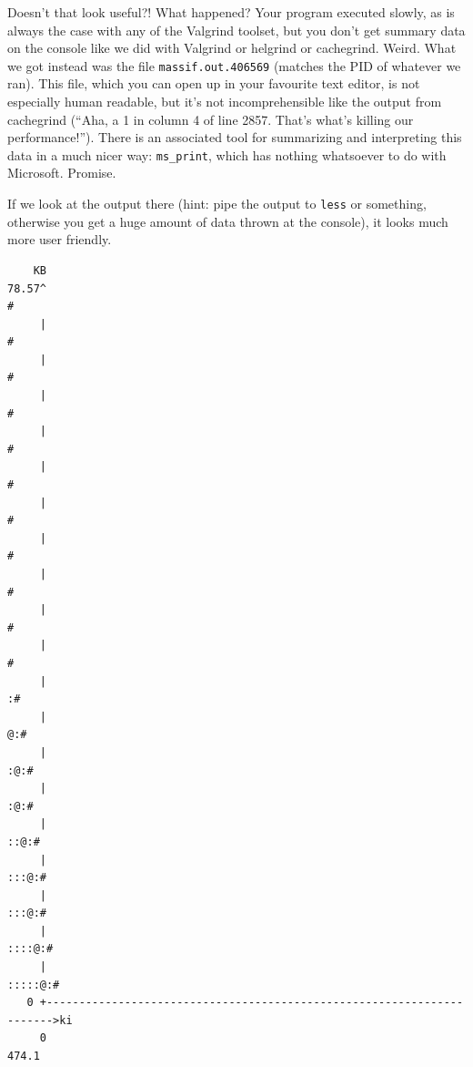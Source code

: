 Doesn't that look useful?! What happened? Your program executed slowly, as is always the case with any of the Valgrind toolset, but you don't get summary data on the console like we did with Valgrind or helgrind or cachegrind. Weird. What we got instead was the file \texttt{massif.out.406569} (matches the PID of whatever we ran). This file, which you can open up in your favourite text editor, is not especially human readable, but it's not incomprehensible like the output from cachegrind (``Aha, a 1 in column 4 of line 2857. That's what's killing our performance!''). There is an associated tool for summarizing and interpreting this data in a much nicer way: \texttt{ms\_print}, which has nothing whatsoever to do with Microsoft. Promise.

If we look at the output there (hint: pipe the output to \texttt{less} or something, otherwise you get a huge amount of data thrown at the console), it looks much more user friendly.

{\scriptsize
\begin{verbatim}
    KB
78.57^                                                                       #
     |                                                                       #
     |                                                                       #
     |                                                                       #
     |                                                                       #
     |                                                                       #
     |                                                                       #
     |                                                                       #
     |                                                                       #
     |                                                                       #
     |                                                                       #
     |                                                                      :#
     |                                                                     @:#
     |                                                                    :@:#
     |                                                                    :@:#
     |                                                                   ::@:#
     |                                                                  :::@:#
     |                                                                  :::@:#
     |                                                                 ::::@:#
     |                                                                :::::@:#
   0 +----------------------------------------------------------------------->ki
     0                                                                   474.1
\end{verbatim}
}

